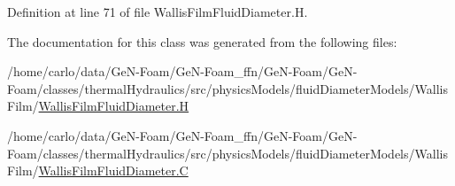 Definition at line 71 of file Wallis\+Film\+Fluid\+Diameter.\+H.



The documentation for this class was generated from the following files\+:\begin{DoxyCompactItemize}
\item 
/home/carlo/data/\+Ge\+N-\/\+Foam/\+Ge\+N-\/\+Foam\+\_\+ffn/\+Ge\+N-\/\+Foam/\+Ge\+N-\/\+Foam/classes/thermal\+Hydraulics/src/physics\+Models/fluid\+Diameter\+Models/\+Wallis\+Film/\hyperlink{WallisFilmFluidDiameter_8H}{Wallis\+Film\+Fluid\+Diameter.\+H}\item 
/home/carlo/data/\+Ge\+N-\/\+Foam/\+Ge\+N-\/\+Foam\+\_\+ffn/\+Ge\+N-\/\+Foam/\+Ge\+N-\/\+Foam/classes/thermal\+Hydraulics/src/physics\+Models/fluid\+Diameter\+Models/\+Wallis\+Film/\hyperlink{WallisFilmFluidDiameter_8C}{Wallis\+Film\+Fluid\+Diameter.\+C}\end{DoxyCompactItemize}
